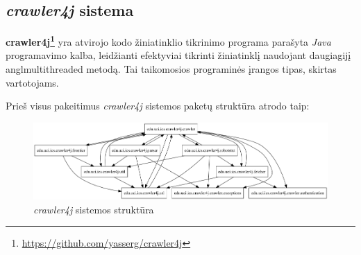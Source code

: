 \subsection{\textit{crawler4j} sistema}
\textbf{crawler4j\footnote{\url{https://github.com/yasserg/crawler4j}}} yra atvirojo kodo
žiniatinklio tikrinimo  programa parašyta \textit{Java} programavimo kalba, leidžianti
efektyviai tikrinti žiniatinklį naudojant daugiagijį angl{multithreaded} metodą.
Tai taikomosios programinės įrangos tipas, skirtas vartotojams.

Prieš visus pakeitimus \textit{crawler4j} sistemos paketų struktūra atrodo taip:
\begin{figure}[H]
    \centering
    \includegraphics[scale=0.5]{img/crawler_packages_orig}
    \caption{\textit{crawler4j} sistemos struktūra}
    \label{img:crawler_packages_orig}
\end{figure}

